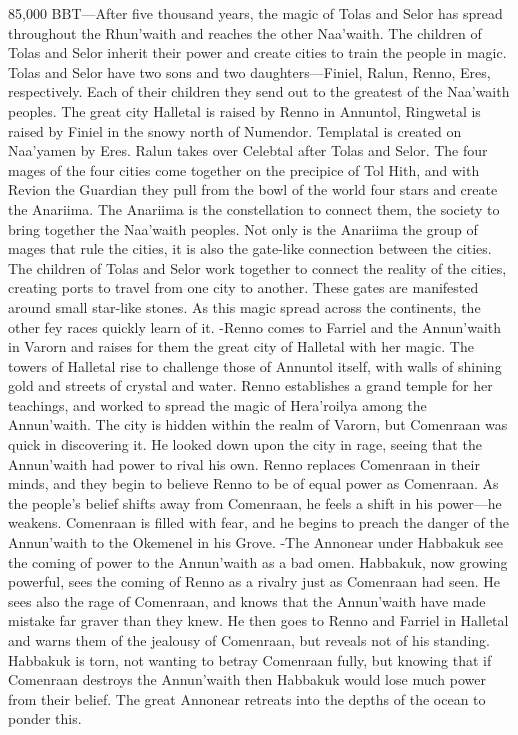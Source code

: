 \documentclass[smalldemyvopaper,11pt,twoside,onecolumn,openright,extrafontsizes]{memoir}
\begin{document}
85,000 BBT—After five thousand years, the magic of Tolas and Selor has spread throughout the Rhun’waith and reaches the other Naa’waith. The children of Tolas and Selor inherit their power and create cities to train the people in magic. Tolas and Selor have two sons and two daughters—Finiel, Ralun, Renno, Eres, respectively. Each of their children they send out to the greatest of the Naa’waith peoples. The great city Halletal is raised by Renno in Annuntol, Ringwetal is raised by Finiel in the snowy north of Numendor. Templatal is created on Naa’yamen by Eres. Ralun takes over Celebtal after Tolas and Selor. The four mages of the four cities come together on the precipice of Tol Hith, and with Revion the Guardian they pull from the bowl of the world four stars and create the Anariima. The Anariima is the constellation to connect them, the society to bring together the Naa’waith peoples. Not only is the Anariima the group of mages that rule the cities, it is also the gate-like connection between the cities. The children of Tolas and Selor work together to connect the reality of the cities, creating ports to travel from one city to another. These gates are manifested around small star-like stones.
	As this magic spread across the continents, the other fey races quickly learn of it.
-Renno comes to Farriel and the Annun’waith in Varorn and raises for them the great city of Halletal with her magic. The towers of Halletal rise to challenge those of Annuntol itself, with walls of shining gold and streets of crystal and water. Renno establishes a grand temple for her teachings, and worked to spread the magic of Hera’roilya among the Annun’waith. The city is hidden within the realm of Varorn, but Comenraan was quick in discovering it. He looked down upon the city in rage, seeing that the Annun’waith had power to rival his own. Renno replaces Comenraan in their minds, and they begin to believe Renno to be of equal power as Comenraan. As the people’s belief shifts away from Comenraan, he feels a shift in his power—he weakens. Comenraan is filled with fear, and he begins to preach the danger of the Annun’waith to the Okemenel in his Grove.
-The Annonear under Habbakuk see the coming of power to the Annun’waith as a bad omen. Habbakuk, now growing powerful, sees the coming of Renno as a rivalry just as Comenraan had seen. He sees also the rage of Comenraan, and knows that the Annun’waith have made mistake far graver than they knew. He then goes to Renno and Farriel in Halletal and warns them of the jealousy of Comenraan, but reveals not of his standing. Habbakuk is torn, not wanting to betray Comenraan fully, but knowing that if Comenraan destroys the Annun’waith then Habbakuk would lose much power from their belief. The great Annonear retreats into the depths of the ocean to ponder this.
\end{document}
